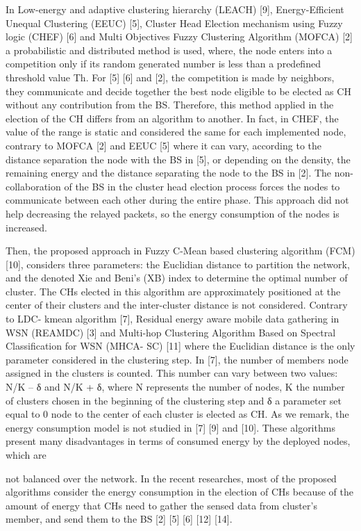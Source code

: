 \documentclass[12 pt]{report}
\begin{document}
\qquad 
In Low-energy and adaptive clustering hierarchy (LEACH)
[9], Energy-Efficient Unequal Clustering (EEUC) [5], Cluster
Head Election mechanism using Fuzzy logic (CHEF) [6] and
Multi Objectives Fuzzy Clustering Algorithm (MOFCA) [2] a
probabilistic and distributed method is used, where, the node
enters into a competition only if its random generated number
is less than a predefined threshold value Th. For [5] [6] and
[2], the competition is made by neighbors, they communicate
and decide together the best node eligible to be elected as CH
without any contribution from the BS. Therefore, this method
applied in the election of the CH differs from an algorithm to
another. In fact, in CHEF, the value of the range is static and
considered the same for each implemented node, contrary to
MOFCA [2] and EEUC [5] where it can vary, according to the
distance separation the node with the BS in [5], or depending
on the density, the remaining energy and the distance
separating the node to the BS in [2]. The non-collaboration of
the BS in the cluster head election process forces the nodes to
communicate between each other during the entire phase. This
approach did not help decreasing the relayed packets, so the
energy consumption of the nodes is increased.

\qquad 
Then, the proposed approach in Fuzzy C-Mean based
clustering algorithm (FCM) [10], considers three parameters:
the Euclidian distance to partition the network, and the
denoted Xie and Beni’s (XB) index to determine the optimal
number of cluster. The CHs elected in this algorithm are
approximately positioned at the center of their clusters and the
inter-cluster distance is not considered. Contrary to LDC-
kmean algorithm [7], Residual energy aware mobile data
gathering in WSN (REAMDC) [3] and Multi-hop Clustering
Algorithm Based on Spectral Classification for WSN (MHCA-
SC) [11] where the Euclidian distance is the only parameter
considered in the clustering step. In [7], the number of
members node assigned in the clusters is counted. This
number can vary between two values: N/K – δ and N/K + δ,
where N represents the number of nodes, K the number of
clusters chosen in the beginning of the clustering step and δ a
parameter set equal to 0%
node to the center of each cluster is elected as CH. As we
remark, the energy consumption model is not studied in [7] [9]
and [10]. These algorithms present many disadvantages in
terms of consumed energy by the deployed nodes, which are

not balanced over the network. In the recent researches, most
of the proposed algorithms consider the energy consumption
in the election of CHs because of the amount of energy that
CHs need to gather the sensed data from cluster’s member,
and send them to the BS [2] [5] [6] [12] [14].
\end{document}
